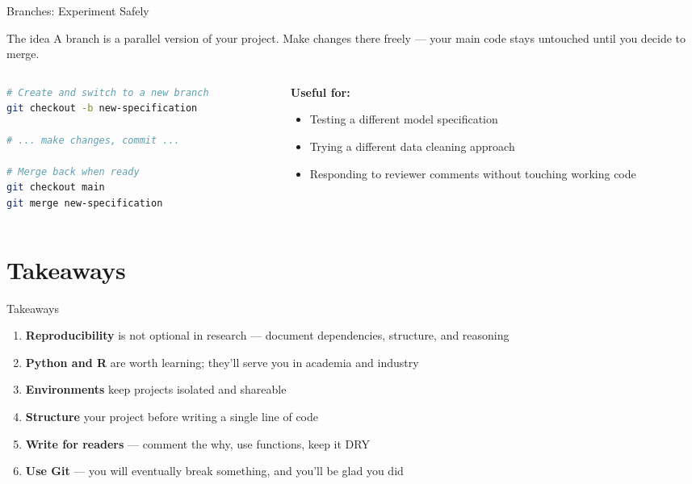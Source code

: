 \documentclass[13pt, aspectratio=169]{beamer}
\begin{document}
\begin{frame}[fragile]{Branches: Experiment Safely}
    \begin{block}{The idea}
        A branch is a parallel version of your project. Make changes there freely — your main code stays untouched until you decide to merge.
    \end{block}

    \vspace{0.5em}
    \begin{columns}
        \begin{column}{0.48\textwidth}
\begin{lstlisting}[language=bash]
# Create and switch to a new branch
git checkout -b new-specification

# ... make changes, commit ...

# Merge back when ready
git checkout main
git merge new-specification
\end{lstlisting}
        \end{column}
        \begin{column}{0.48\textwidth}
            \textbf{Useful for:}
            \begin{itemize}
                \item Testing a different model specification
                \item Trying a different data cleaning approach
                \item Responding to reviewer comments without touching working code
            \end{itemize}
        \end{column}
    \end{columns}
\end{frame}

\section*{Takeaways}

\begin{frame}{Takeaways}
    \begin{enumerate}
        \item \textbf{Reproducibility} is not optional in research — document dependencies, structure, and reasoning
        \item \textbf{Python and R} are worth learning; they'll serve you in academia and industry
        \item \textbf{Environments} keep projects isolated and shareable
        \item \textbf{Structure} your project before writing a single line of code
        \item \textbf{Write for readers} — comment the why, use functions, keep it DRY
        \item \textbf{Use Git} — you will eventually break something, and you'll be glad you did
    \end{enumerate}
\end{frame}
\end{document}
